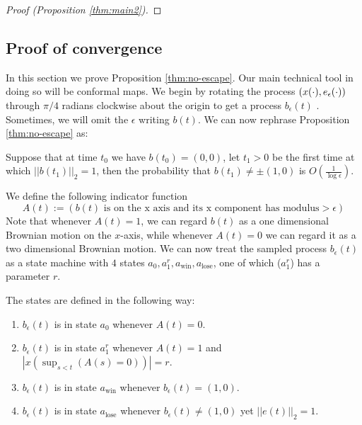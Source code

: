{\begin{proof}[Proof (Proposition \ref{thm:main2})]
\end{proof}

\subsection{Proof of convergence}\label{sec:POC}
{
In this section we prove Proposition \ref{thm:no-escape}. Our main technical tool in doing so will
be conformal maps. We begin by rotating the process $(x(\cdot), e_\epsilon(\cdot))$
through $\pi/4$ radians clockwise about the origin to get a process
$b_\epsilon(t)$ .
Sometimes, we will omit the $\epsilon$ writing $b(t)$. 
We can now rephrase Proposition
\ref{thm:no-escape} as:

\begin{propos}\label{prop:reph}
Suppose that at time $t_0$ we have
${b}(t_0)=(0,0)$, let $t_1>0$ be the first time at which
$||b(t_1)||_2=1$, then the probability that $b(t_1)\neq \pm(1,0)$ is
$O\left(\frac1{\log\epsilon}\right)$.
\end{propos}

We define the following indicator function
\[A(t):= (b(t) \text{ is on the x axis and its x component has modulus
} > \epsilon)\]
Note that whenever $A(t)=1$,
we can regard $b(t)$ as a one dimensional Brownian motion on the
$x$-axis, while whenever $A(t)=0$ we can regard it as a two
dimensional Brownian motion. We can now treat the sampled
process $b_\epsilon(t)$ as a state machine with $4$ states
$a_0,a^r_1,a_{\text{win}},a_{\text{lose}}$, one of which ($a^r_1$) has a parameter $r$.

The states are defined in the following way:
\begin{enumerate}
\item\label{n1} $b_\epsilon(t)$ is in state $a_0$ whenever $A(t)=0$.
\item\label{n2} $b_\epsilon(t)$ is in state $a^r_1$ whenever $A(t)=1$ and $|x(\sup_{s<t}(A(s)=0))|=r$.
\item\label{n3} $b_\epsilon(t)$ is in state $a_\text{win}$ whenever $b_\epsilon(t)=(1,0)$.
\item\label{n4} $b_\epsilon(t)$ is in state $a_\text{lose}$ whenever $b_\epsilon(t)\neq(1,0)$ yet $||e(t)||_2=1$.
\end{enumerate}

}}
